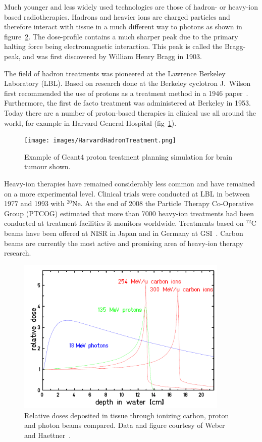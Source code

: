 Much younger and less widely used technologies are those of hadron- or heavy-ion based radiotherapies. Hadrons and heavier ions are charged particles and therefore interact with tissue in a much different way to photons as shown in figure~\ref{fig:DosesFromHaettner}. The dose-profile contains a much sharper peak due to the primary halting force being electromagnetic interaction. This peak is called the Bragg-peak, and was first discovered by William Henry Bragg in 1903.

The field of hadron treatments was pioneered at the Lawrence Berkeley Laboratory (LBL). Based on research done at the Berkeley cyclotron J.~Wilson first recommended the use of protons as a treatment method in a 1946 paper~\cite{RW46}. Furthermore, the first de facto treatment was administered at Berkeley in 1953. Today there are a number of proton-based therapies in clinical use all around the world, for example in Harvard General Hospital (fig~\ref{fig:HarvardHadron}).
\begin{figure}[!h]
\begin{center}
\texttt{[image: images/HarvardHadronTreatment.png]}  
\caption{\label{fig:HarvardHadron} Example of Geant4 proton treatment planning simulation for brain tumour shown.} 
\end{center}
\end{figure} 
Heavy-ion therapies have remained considerably less common and have remained on a more experimental level. Clinical trials were conducted at LBL in between 1977 and 1993 with $^{20}$Ne. At the end of 2008 the Particle Therapy Co-Operative  Group (PTCOG) estimated that more than 7000 heavy-ion treatments had been conducted at treatment facilities it monitors worldwide. Treatments based on $^{12}$C beams have been offered at NISR in Japan and in Germany at GSI~\cite{PTCOGstat}. Carbon beams are currently the most active and promising area of heavy-ion therapy research. 
\begin{figure}[!h]
\begin{center}
\includegraphics[width=0.9\textwidth]{images/DosesFromHaettner.png}  
\caption{\label{fig:DosesFromHaettner} Relative doses deposited in tissue through ionizing carbon, proton and photon beams compared. Data and figure courtesy of Weber~\cite{weber} and Haettner~\cite{ehaettner}.} 
\end{center}
\end{figure} 

